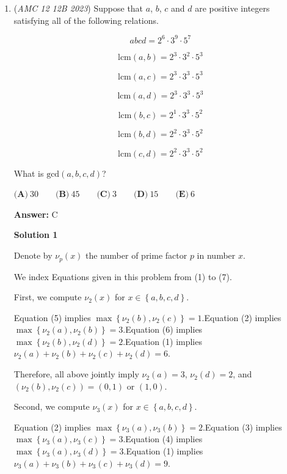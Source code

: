 \begin{enumerate}
 Hence
 \[(n+1)^2(n+2)=1872=12^2\cdot13.\]

 Since the left-hand side is strictly increasing for positive integers $n$, we obtain
 \[\boxed{n=11}.\]



	\item (\textit{AMC 12 12B 2023}) Suppose that $a$, $b$, $c$ and $d$ are positive integers satisfying all of the following relations.


 
 \[abcd=2^6\cdot 3^9\cdot 5^7\]

 \[\text{lcm}(a,b)=2^3\cdot 3^2\cdot 5^3\]

 \[\text{lcm}(a,c)=2^3\cdot 3^3\cdot 5^3\]

 \[\text{lcm}(a,d)=2^3\cdot 3^3\cdot 5^3\]

 \[\text{lcm}(b,c)=2^1\cdot 3^3\cdot 5^2\]

 \[\text{lcm}(b,d)=2^2\cdot 3^3\cdot 5^2\]

 \[\text{lcm}(c,d)=2^2\cdot 3^3\cdot 5^2\]


 What is $\text{gcd}(a,b,c,d)$?


 $\textbf{(A)}~30\qquad\textbf{(B)}~45\qquad\textbf{(C)}~3\qquad\textbf{(D)}~15\qquad\textbf{(E)}~6$

 \textbf{Answer: }C



\textbf{Solution 1}

Denote by $\nu_p (x)$ the number of prime factor $p$ in number $x$.

 We index Equations given in this problem from (1) to (7).

 
First, we compute $\nu_2 (x)$ for $x \in \left\{ a, b, c, d \right\}$.

 Equation (5) implies $\max \left\{ \nu_2 (b), \nu_2 (c) \right\} = 1$.Equation (2) implies $\max \left\{ \nu_2 (a), \nu_2 (b) \right\} = 3$.Equation (6) implies $\max \left\{ \nu_2 (b), \nu_2 (d) \right\} = 2$.Equation (1) implies $\nu_2 (a) + \nu_2 (b) + \nu_2 (c) + \nu_2 (d) = 6$.

 Therefore, all above jointly imply $\nu_2 (a) = 3$, $\nu_2 (d) = 2$, and $\left( \nu_2 (b), \nu_2 (c) \right) = \left( 0 , 1 \right)$ or $\left( 1, 0 \right)$.

 
Second, we compute $\nu_3 (x)$ for $x \in \left\{ a, b, c, d \right\}$.

 Equation (2) implies $\max \left\{ \nu_3 (a), \nu_3 (b) \right\} = 2$.Equation (3) implies $\max \left\{ \nu_3 (a), \nu_3 (c) \right\} = 3$.Equation (4) implies $\max \left\{ \nu_3 (a), \nu_3 (d) \right\} = 3$.Equation (1) implies $\nu_3 (a) + \nu_3 (b) + \nu_3 (c) + \nu_3 (d) = 9$.


\end{enumerate}
